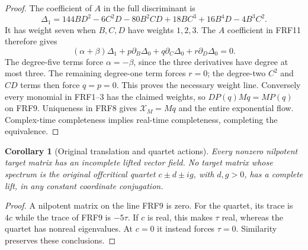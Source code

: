 \documentclass[11pt]{article}
\newtheorem{corollary}[theorem]{Corollary}
\begin{document}
\begin{proof}
The coefficient of $A$ in the full discriminant is
\[
 \Delta_1=144BD^2-6C^2D-80B^2CD+18BC^3+16B^4D-4B^3C^2.
 \tag{FRF14}
\]
It has weight seven when $B,C,D$ have weights $1,2,3$. The $A$ coefficient
in FRF11 therefore gives
\[
 (\alpha+\beta)\Delta_1+
 p\partial_B\Delta_0+q\partial_C\Delta_0+r\partial_D\Delta_0=0.
\]
The degree-five terms force $\alpha=-\beta$, since the three derivatives
have degree at most three. The remaining degree-one term forces $r=0$;
the degree-two $C^2$ and $CD$ terms then force $q=p=0$. This proves the
necessary weight line. Conversely every monomial in FRF1--3 has the
claimed weights, so $DP(q)Mq=MP(q)$ on FRF9. Uniqueness in FRF8 gives
$\mathcal X_M=Mq$ and the entire exponential flow. Complex-time
completeness implies real-time completeness, completing the equivalence.
\end{proof}

\begin{corollary}[Original translation and quartet actions]
Every nonzero nilpotent target matrix has an incomplete lifted vector field.
No target matrix whose spectrum is the original offcritical quartet
$c\pm d\pm ig$, with $d,g>0$, has a complete lift, in any constant
coordinate conjugation.
\end{corollary}
\begin{proof}
A nilpotent matrix on the line FRF9 is zero. For the quartet, its trace
is $4c$ while the trace of FRF9 is $-5\tau$. If $c$ is real, this makes
$\tau$ real, whereas the quartet has nonreal eigenvalues. At $c=0$ it
instead forces $\tau=0$. Similarity preserves these conclusions.
\end{proof}
\end{document}
